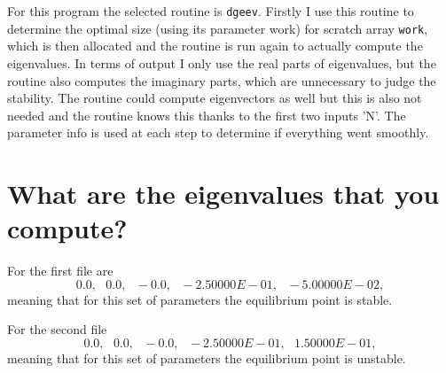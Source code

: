 \documentclass[a4paper]{article}
\begin{document}
For this program the selected routine is \texttt{dgeev}. Firstly I use this routine to determine the optimal size (using its parameter work) for scratch array \texttt{work}, which is then allocated and the routine is run again to actually compute the eigenvalues. In terms of output I only use the real parts of eigenvalues, but the routine also computes the imaginary parts, which are unnecessary to judge the stability. The routine could compute eigenvectors as well but this is also not needed and the routine knows this thanks to the first two inputs 'N'. The parameter info is used at each step to determine if everything went smoothly. 

\section{What are the eigenvalues that you compute?}
For the first file are
\begin{equation}
0.0, \,\,\,\,  0.0, \,\,\,\,  -0.0, \,\,\,\,  -2.50000E-01,  \,\,\,\, -5.00000E-02,
\end{equation}
meaning that for this set of parameters the equilibrium point is stable.

For the second file
\begin{equation}
	0.0 ,\,\,\,\,  0.0 , \,\,\,\, -0.0, \,\,\,\,  -2.50000E-01,  \,\,\,\,  1.50000E-01,
\end{equation}
meaning that for this set of parameters the equilibrium point is unstable.
\end{document}

